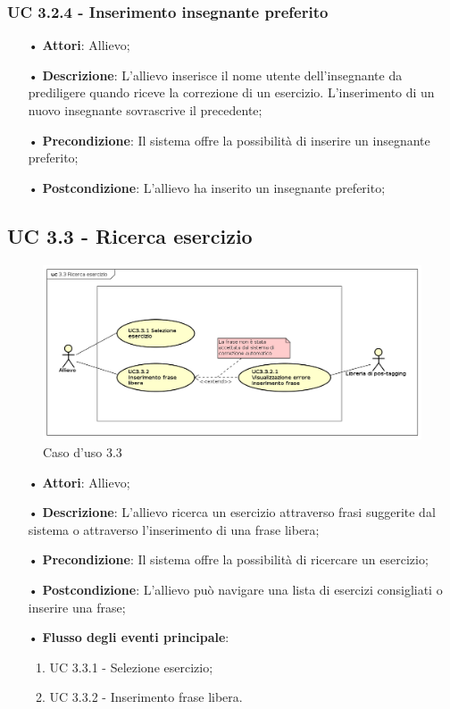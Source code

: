 \subsubsection{UC 3.2.4 - Inserimento insegnante preferito}
\begin{itemize}
\item[•]\textbf{Attori}: Allievo;
\item[•]\textbf{Descrizione}: L’allievo inserisce il nome utente dell’insegnante da prediligere quando riceve la correzione di un esercizio. L’inserimento di un nuovo insegnante sovrascrive il precedente;
\item[•]\textbf{Precondizione}: Il sistema offre la possibilità di inserire un insegnante preferito;
\item[•]\textbf{Postcondizione}: L’allievo ha inserito un insegnante preferito;
\end{itemize}

\subsection{UC 3.3 - Ricerca esercizio}
\begin{figure}[H]
\centering
\includegraphics[width=17cm]{img/UC33.png} 
\caption{Caso d'uso 3.3}\label{fig:33}
\end{figure}
\begin{itemize}
\item[•]\textbf{Attori}: Allievo;
\item[•]\textbf{Descrizione}: L’allievo ricerca un esercizio attraverso frasi suggerite dal sistema o attraverso l’inserimento di una frase libera;
\item[•]\textbf{Precondizione}: Il sistema offre la possibilità di ricercare un esercizio;
\item[•]\textbf{Postcondizione}: L’allievo può navigare una lista di esercizi consigliati o inserire una frase;
\item[•]\textbf{Flusso degli eventi principale}:
\begin{enumerate}
\item UC 3.3.1 - Selezione esercizio;
\item UC 3.3.2 - Inserimento frase libera.
\end{enumerate}
\end{itemize}

